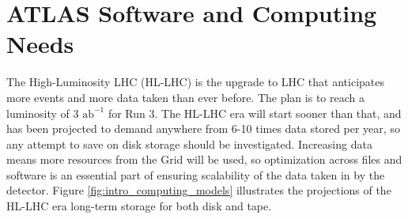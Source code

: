 \section{ATLAS Software and Computing Needs}
The High-Luminosity LHC (HL-LHC) is the upgrade to LHC that anticipates more events and more data taken than ever before.
The plan is to reach a luminosity of $3 \text{ ab}^{-1}$ for Run 3.\cite{HL-LHC_Tech_design}
The HL-LHC era will start sooner than that, and has been projected to demand anywhere from 6-10 times data stored per year, so any attempt to save on disk storage should be investigated.\cite{ATLAS_HL-LHC_projections}
Increasing data means more resources from the Grid will be used, so optimization across files and software is an essential part of ensuring scalability of the data taken in by the detector.
Figure \ref{fig:intro_computing_models} illustrates the projections of the HL-LHC era long-term storage for both disk and tape. 

